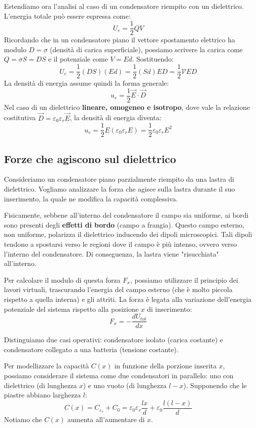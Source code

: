 \documentclass{book}
\begin{document}
Estendiamo ora l'analisi al caso di un condensatore riempito con un dielettrico. L'energia totale può essere espressa come:
$$
U_e=\frac{1}{2}QV
$$
Ricordando che in un condensatore piano il vettore spostamento elettrico ha modulo $D=\sigma$ (densità di carica superficiale), possiamo scrivere la carica come $Q=\sigma S = DS$ e il potenziale come $V=Ed$. Sostituendo:
$$
U_e = \frac{1}{2}(DS)(Ed) = \frac{1}{2}(Sd)ED = \frac{1}{2}\mathcal{V}ED
$$
La densità di energia assume quindi la forma generale:
$$ u_e = \frac{1}{2}\vec{E}\cdot \vec{D}$$
Nel caso di un dielettrico \textbf{lineare, omogeneo e isotropo}, dove vale la relazione costitutiva $\vec{D}= \varepsilon_0\varepsilon_r \vec{E}$, la densità di energia diventa:
$$
u_e=\frac{1}{2}E (\varepsilon_0\varepsilon_r E) = \frac{1}{2}\varepsilon_0\varepsilon_r E^2
$$

\subsection{Forze che agiscono sul dielettrico}
Consideriamo un condensatore piano parzialmente riempito da una lastra di dielettrico. Vogliamo analizzare la forza che agisce sulla lastra durante il suo inserimento, la quale ne modifica la capacità complessiva.

Fisicamente, sebbene all'interno del condensatore il campo sia uniforme, ai bordi sono presenti degli \textbf{effetti di bordo} (campo a frangia). Questo campo esterno, non uniforme, polarizza il dielettrico inducendo dei dipoli microscopici. Tali dipoli tendono a spostarsi verso le regioni dove il campo è più intenso, ovvero verso l'interno del condensatore. Di conseguenza, la lastra viene "risucchiata" all'interno.

Per calcolare il modulo di questa forza $F_x$, possiamo utilizzare il principio dei lavori virtuali, trascurando l'energia del campo esterno (che è molto piccola rispetto a quella interna) e gli attriti. La forza è legata alla variazione dell'energia potenziale del sistema rispetto alla posizione $x$ di inserimento:
$$
F_x = - \frac{dU_{tot}}{dx}
$$

Distinguiamo due casi operativi: condensatore isolato (carica costante) e condensatore collegato a una batteria (tensione costante).

Per modellizzare la capacità $C(x)$ in funzione della porzione inserita $x$, possiamo considerare il sistema come due condensatori in parallelo: uno con dielettrico (di lunghezza $x$) e uno vuoto (di lunghezza $l-x$). Supponendo che le piastre abbiano larghezza $l$:
$$
C(x) = C_{\varepsilon_r} + C_0 = \varepsilon_0\varepsilon_r \frac{lx}{d} + \varepsilon_0 \frac{l(l-x)}{d}
$$
Notiamo che $C(x)$ aumenta all'aumentare di $x$.
\end{document}

